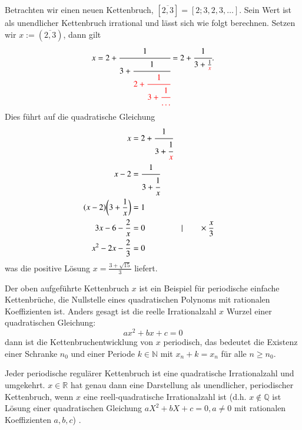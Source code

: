\begin{beispiel}
Betrachten wir einen neuen Kettenbruch, $[\overline{2,3}] =  [2;3,2,3,\dots]$.
Sein Wert ist als unendlicher Kettenbruch irrational und lässt sich
wie folgt berechnen. Setzen wir $x:=(\overline{2,3})$, dann gilt
\begin{equation}
x
=
2 + \cfrac{1}{3+\cfrac{1}{\color{red}2+\cfrac{1}{3+\cfrac{1}{\dots}}}}
=
2 + \cfrac{1}{3+\frac{1}{\color{red}x}}.
\end{equation}
Dies führt auf die quadratische Gleichung 
\begin{align*}
x &= 2 + \cfrac{1}{3+\cfrac{1}{{\color{red}x}}}
\\
x - 2 &= \cfrac{1}{3+\cfrac{1}{x}}
\\
(x - 2)\biggl(3 + \frac{1}{x}\biggr) &= 1
\\
3x - 6 - \frac{2}{x} &= 0 &&\vert \qquad\times\frac{x}{3}
\\
x^2 - 2x - \frac{2}{3} &= 0
\end{align*}
was die positive Lösung $x = \displaystyle \frac{3+\sqrt{15}}{3}$ liefert.
\end{beispiel}
Der oben aufgeführte Kettenbruch $x$ ist ein Beispiel für periodische
einfache Kettenbrüche, die Nullstelle eines quadratischen Polynoms
mit rationalen Koeffizienten ist. Anders gesagt ist die reelle
Irrationalzahl $x$ Wurzel einer quadratischen Gleichung:
\begin{equation}
ax^2 + bx + c = 0
\end{equation}
dann ist die Kettenbruchentwicklung von $x$ periodisch, das bedeutet
die Existenz einer Schranke $n_0$ und einer Periode $k \in \mathbb{N}$
mit $x_n+k = x_n$ für alle $n\ge n_0$.

\begin{satz}
Jeder periodische regulärer Kettenbruch ist eine quadratische
Irrationalzahl und umgekehrt. $x \in \mathbb{R}$ hat genau dann eine 
Darstellung als unendlicher, periodischer Kettenbruch, wenn $x$ eine
reell-quadratische Irrationalzahl ist (d.h. $x \notin \mathbb{Q}$ ist Lösung
einer quadratischen Gleichung $aX^2 + bX + c = 0, a \neq 0$ mit rationalen 
Koeffizienten $a,b,c$) \cite{kettenbruch:perron}.
\end{satz}

